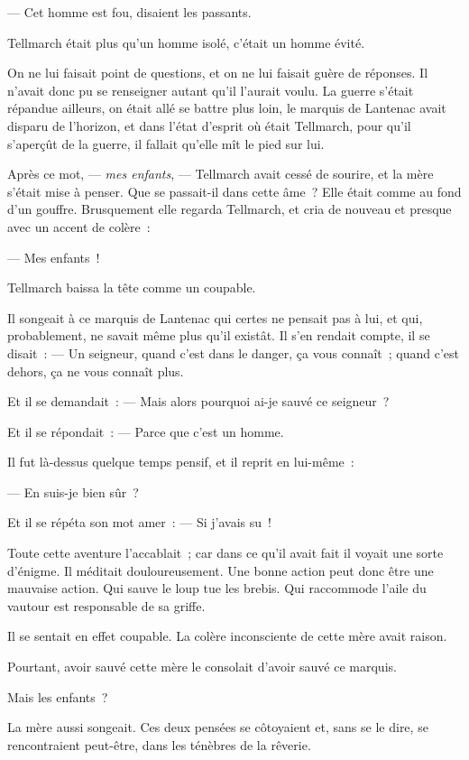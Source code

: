 \documentclass[french,twoside]{book} %
\begin{document}
— Cet homme est fou, disaient les passants.\par
Tellmarch était plus qu’un homme isolé, c’était un homme évité.\par
On ne lui faisait point de questions, et on ne lui faisait guère de réponses. Il n’avait donc pu se renseigner autant qu’il l’aurait voulu. La guerre s’était répandue ailleurs, on était allé se battre plus loin, le marquis de Lantenac avait disparu de l’horizon, et dans l’état d’esprit où était Tellmarch, pour qu’il s’aperçût de la guerre, il fallait qu’elle mît le pied sur lui.\par
Après ce mot, — \emph{mes enfants}, — Tellmarch avait cessé de sourire, et la mère s’était mise à penser. Que se passait-il dans cette âme ? Elle était comme au fond d’un gouffre. Brusquement elle regarda Tellmarch, et cria de nouveau et presque avec un accent de colère :\par
— Mes enfants !\par
Tellmarch baissa la tête comme un coupable.\par
Il songeait à ce marquis de Lantenac qui certes ne pensait pas à lui, et qui, probablement, ne savait même plus qu’il existât. Il s’en rendait compte, il se disait : — Un seigneur, quand c’est dans le danger, ça vous  connaît ; quand c’est dehors, ça ne vous connaît plus.\par
Et il se demandait : — Mais alors pourquoi ai-je sauvé ce seigneur ?\par
Et il se répondait : — Parce que c’est un homme.\par
Il fut là-dessus quelque temps pensif, et il reprit en lui-même :\par
— En suis-je bien sûr ?\par
Et il se répéta son mot amer : — Si j’avais su !\par
Toute cette aventure l’accablait ; car dans ce qu’il avait fait il voyait une sorte d’énigme. Il méditait douloureusement. Une bonne action peut donc être une mauvaise action. Qui sauve le loup tue les brebis. Qui raccommode l’aile du vautour est responsable de sa griffe.\par
Il se sentait en effet coupable. La colère inconsciente de cette mère avait raison.\par
Pourtant, avoir sauvé cette mère le consolait d’avoir sauvé ce marquis.\par
Mais les enfants ?\par
La mère aussi songeait. Ces deux pensées se côtoyaient et, sans se le dire, se rencontraient peut-être, dans les ténèbres de la rêverie.\par
\end{document}

